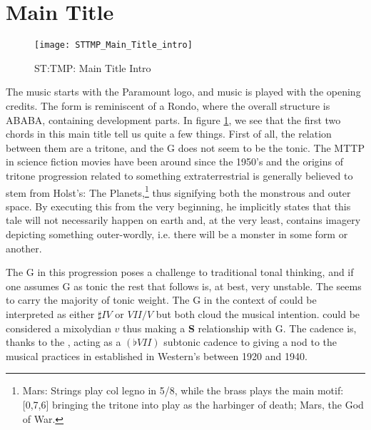 \section{Main Title}\label{sec:STTMP Main Title}
\begin{figure}[h!]
\center
\texttt{[image: STTMP\_Main\_Title\_intro]}
	\caption{ST:TMP: Main Title Intro}
	\label{fg:sttmp_main_title_intro}
\end{figure}

\noindent The music starts with the Paramount logo, and music is played with the opening credits. The form is reminiscent of a Rondo, where the overall structure is ABABA, containing development parts.
In figure \ref{fg:sttmp_main_title_intro}, we see that the first two chords in this main title tell us quite a few things. First of all, the relation between them are a tritone, and the G does not seem to be the tonic. The \acf{MTTP} in science fiction movies have been around since the 1950's\parencite{murphy_major_2006} and the origins of tritone progression related to something extraterrestrial is generally believed to stem from Holst's: The Planets,\footnote{Mars: Strings play col legno in 5/8, while the brass plays the main motif: [0,7,6]  bringing the tritone into play as the harbinger of death; Mars, the God of War.} thus signifying both the monstrous\parencite{fairweather_jerry_2014} and outer space. By executing this from the very beginning, he implicitly states that this tale will not necessarily happen on earth and, at the very least, contains imagery depicting something outer-wordly, i.e. there will be a monster in some form or another. 

The G in this progression poses a challenge to traditional tonal thinking, and if one assumes G as tonic the rest that follows is, at best, very unstable. The \ciss seems to carry the majority of tonic weight. The G in the context of \ciss could be interpreted as either \(\sharp{IV}\) or \(VII/V\) but both cloud the musical intention. \gissm could be considered a mixolydian \(v\) thus making a \textbf{S} relationship with G. The cadence is, thanks to the \giss, acting as a \(({\flat}VII)\) subtonic cadence to \bflat giving a nod to the musical practices in established in Western's between 1920 and 1940.

